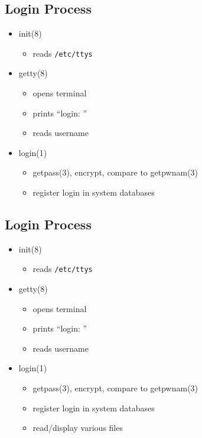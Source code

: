 \documentclass[xga]{xdvislides}
\begin{document}
\subsection{Login Process}
\begin{itemize}
	\item init(8)
		\begin{itemize}
			\item reads {\tt /etc/ttys}
		\end{itemize}
	\item getty(8)
		\begin{itemize}
			\item opens terminal
			\item prints ``login: ''
			\item reads username
		\end{itemize}
	\item login(1)
		\begin{itemize}
			\item getpass(3), encrypt, compare to getpwnam(3)
			\item register login in system databases
		\end{itemize}
\end{itemize}

\subsection{Login Process}
\begin{itemize}
	\item init(8)
		\begin{itemize}
			\item reads {\tt /etc/ttys}
		\end{itemize}
	\item getty(8)
		\begin{itemize}
			\item opens terminal
			\item prints ``login: ''
			\item reads username
		\end{itemize}
	\item login(1)
		\begin{itemize}
			\item getpass(3), encrypt, compare to getpwnam(3)
			\item register login in system databases
			\item read/display various files
		\end{itemize}
\end{itemize}
\end{document}
